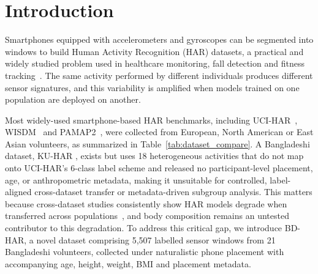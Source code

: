 \documentclass[conference]{IEEEtran}
\begin{document}
\section{Introduction}
\label{sec:intro}

Smartphones equipped with accelerometers and gyroscopes can be
segmented into windows to build Human Activity Recognition (HAR)
datasets, a practical and widely studied problem
\cite{anguita_public_2013} used in healthcare monitoring, fall
detection and fitness tracking~\cite{martins_elderhar_2026,
miah_sensor_based_2024, alanazi_human_2024}. The same activity performed by different individuals produces different sensor signatures, and this variability is amplified when models trained on one population are deployed on another.

Most widely-used smartphone-based HAR benchmarks, including
UCI-HAR~\cite{anguita_public_2013}, WISDM~\cite{kwapisz_activity_2011}
and PAMAP2~\cite{reiss_introducing_2012}, were collected from European,
North American or East Asian volunteers, as summarized in
Table~\ref{tab:dataset_compare}. A Bangladeshi dataset, KU-HAR
\cite{sikder_kuhar_2021}, exists but uses 18 heterogeneous activities
that do not map onto UCI-HAR's 6-class label scheme and released no
participant-level placement, age, or anthropometric metadata, making
it unsuitable for controlled, label-aligned cross-dataset transfer or
metadata-driven subgroup analysis. This matters because cross-dataset
studies consistently show HAR models degrade when transferred across
populations~\cite{hong_crosshar_2024, napoli_benchmark_2024}, and body composition remains an untested contributor to this degradation. To address this critical
gap, we introduce BD-HAR, a novel dataset comprising 5{,}507 labelled
sensor windows from 21 Bangladeshi volunteers, collected under
naturalistic phone placement with accompanying age, height, weight,
BMI and placement metadata.
\end{document}
